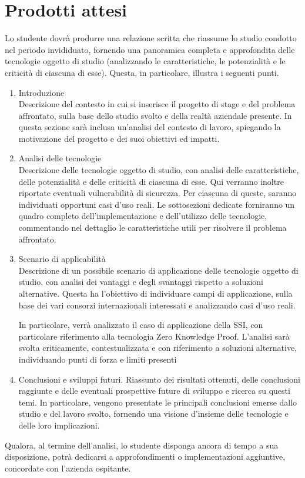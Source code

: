 \section*{Prodotti attesi}
Lo studente dovrà produrre una relazione scritta che riassume lo studio condotto nel periodo invididuato,
fornendo una panoramica completa e approfondita delle tecnologie oggetto di studio (analizzando le caratteristiche, le potenzialità e le criticità di ciascuna di esse).
Questa, in particolare, illustra i seguenti punti.
\begin{enumerate}
    \item Introduzione \\
    Descrizione del contesto in cui si inserisce il progetto di stage e del problema affrontato, sulla base dello studio svolto e della realtà aziendale presente.
    In questa sezione sarà inclusa un'analisi del contesto di lavoro, spiegando la motivazione del progetto e dei suoi obiettivi ed impatti.

    \item Analisi delle tecnologie \\
    Descrizione delle tecnologie oggetto di studio, con analisi delle caratteristiche, delle potenzialità e delle criticità di ciascuna di esse. Qui verranno inoltre riportate eventuali vulnerabilità di sicurezza. 
    Per ciascuna di queste, saranno individuati opportuni casi d'uso reali. Le sottosezioni dedicate forniranno un quadro completo dell'implementazione e dell'utilizzo delle tecnologie, commentando nel dettaglio le caratteristiche utili 
    per risolvere il problema affrontato.

    \item Scenario di applicabilità \\
    Descrizione di un possibile scenario di applicazione delle tecnologie oggetto di studio, con analisi dei vantaggi e degli svantaggi rispetto a soluzioni alternative.
    Questa ha l'obiettivo di individuare campi di applicazione, sulla base dei vari consorzi internazionali interessati e analizzando casi d'uso reali. 

    \medskip
    
    In particolare, verrà analizzato il caso di applicazione della SSI, con particolare riferimento alla tecnologia Zero Knowledge Proof.
    L'analisi sarà svolta criticamente, contestualizzata e con riferimento a soluzioni alternative, individuando punti di forza e limiti presenti
    

    \item Conclusioni e sviluppi futuri.
    Riassunto dei risultati ottenuti, delle conclusioni raggiunte e delle eventuali prospettive future di sviluppo e ricerca su questi temi.
    In particolare, vengono presentate le principali conclusioni emerse dallo studio e del lavoro svolto, fornendo una visione d'insieme delle tecnologie e delle loro implicazioni.

\end{enumerate}

Qualora, al termine dell'analisi, lo studente disponga ancora di tempo a sua disposizione, potrà dedicarsi a approfondimenti o implementazioni aggiuntive, concordate con l'azienda ospitante.